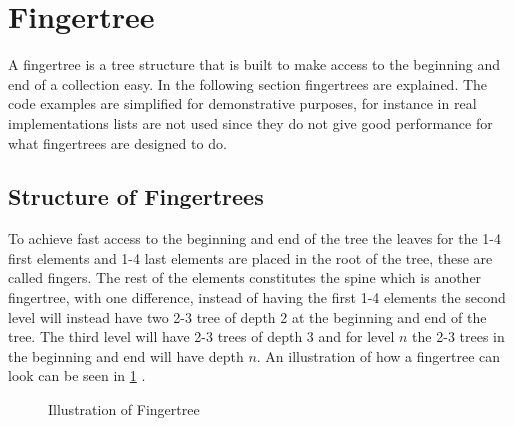 \newpage

\section{Fingertree}
A fingertree is a tree structure that is built to make access to the beginning
and end of a collection easy. In the following section fingertrees are
explained. The code examples are simplified for demonstrative purposes, for
instance in real implementations lists are not used since they do not give good
performance for what fingertrees are designed to do.

\subsection{Structure of Fingertrees}
To achieve fast access to the beginning and end of the tree the leaves for the
1-4 first elements and 1-4 last elements are placed in the root of the tree,
these are called fingers. The rest of
the elements constitutes the spine which is another fingertree, with one
difference, instead of having the first 1-4 elements the second level will
instead have two 2-3 tree of depth 2 at the beginning and end of the tree. The
third level will have 2-3 trees of depth 3 and for level $n$ the 2-3 trees in
the beginning and end will have depth $n$. An illustration of how a fingertree
can look can be seen in \cref{fig:fingertree} \cite{fingertree}.

\begin{figure}[!h]
\centering
{} 
\caption{Illustration of Fingertree \label{fig:fingertree}}
\end{figure}

